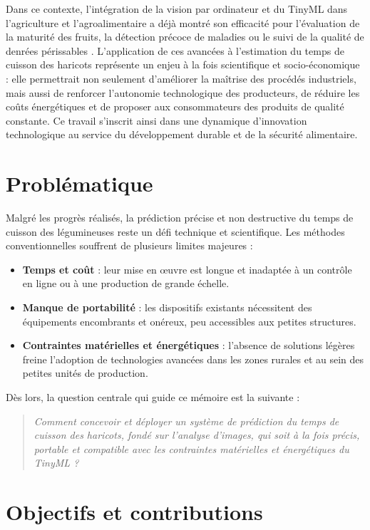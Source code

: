 Dans ce contexte, l’intégration de la vision par ordinateur et du TinyML dans l’agriculture et l’agroalimentaire a déjà montré son efficacité pour l’évaluation de la maturité des fruits, la détection précoce de maladies ou le suivi de la qualité de denrées périssables \cite{tastan2023}. L’application de ces avancées à l’estimation du temps de cuisson des haricots représente un enjeu à la fois scientifique et socio-économique : elle permettrait non seulement d’améliorer la maîtrise des procédés industriels, mais aussi de renforcer l’autonomie technologique des producteurs, de réduire les coûts énergétiques et de proposer aux consommateurs des produits de qualité constante. Ce travail s’inscrit ainsi dans une dynamique d’innovation technologique au service du développement durable et de la sécurité alimentaire.

\section{Problématique}
Malgré les progrès réalisés, la prédiction précise et non destructive du temps de cuisson des légumineuses reste un défi technique et scientifique. Les méthodes conventionnelles souffrent de plusieurs limites majeures :
\begin{itemize}
	\item \textbf{Temps et coût} : leur mise en œuvre est longue et inadaptée à un contrôle en ligne ou à une production de grande échelle.
	\item \textbf{Manque de portabilité} : les dispositifs existants nécessitent des équipements encombrants et onéreux, peu accessibles aux petites structures.
	\item \textbf{Contraintes matérielles et énergétiques} : l’absence de solutions légères freine l’adoption de technologies avancées dans les zones rurales et au sein des petites unités de production.
\end{itemize}

Dès lors, la question centrale qui guide ce mémoire est la suivante :
\begin{quote}
	\textit{Comment concevoir et déployer un système de prédiction du temps de cuisson des haricots, fondé sur l’analyse d’images, qui soit à la fois précis, portable et compatible avec les contraintes matérielles et énergétiques du TinyML ?}
\end{quote}

\section{Objectifs et contributions}

